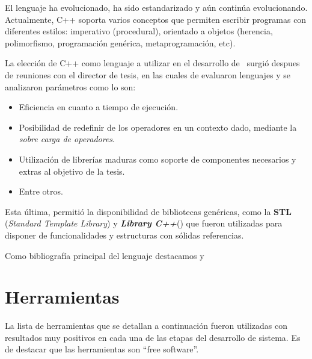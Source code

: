 El lenguaje ha evolucionado, ha sido estandarizado y aún continúa evolucionando. Actualmente, C++ soporta varios conceptos que permiten escribir programas con diferentes estilos: imperativo (procedural), orientado a objetos (herencia, polimorfismo, programación genérica, metaprogramación, etc).

La elección de C++ como lenguaje a utilizar en el desarrollo de \maggen\ surgió despues de reuniones con el director de tesis, en las cuales de evaluaron lenguajes y se analizaron parámetros como lo son:

\begin{itemize}
\item Eficiencia en cuanto a tiempo de ejecución.

\item Posibilidad de redefinir de los operadores en un contexto dado, mediante la \textit{sobre carga de operadores}.

\item Utilización de librerías maduras como soporte de componentes necesarios y extras al objetivo de la tesis.

\item Entre otros.
\end{itemize}

Esta última, permitió la disponibilidad de bibliotecas genéricas, como la \textbf{STL} (\textit{Standard Template Library}) y \boost \textbf{\textit{Library C++}}(\cite{boost}) que fueron utilizadas para disponer de funcionalidades y estructuras con sólidas referencias.

Como bibliografía principal del lenguaje destacamos \cite{c++1} y \cite{c++2}

\section{Herramientas}
La lista de herramientas que se detallan a continuación fueron utilizadas con resultados muy positivos en cada una de las etapas del desarrollo de sistema. Es de destacar que las herramientas son ``free software''.

